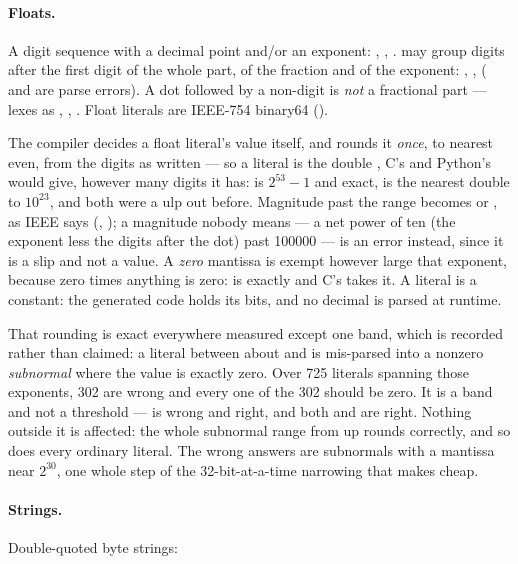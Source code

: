 \paragraph{Floats.} A digit sequence with a decimal point and/or an
exponent: , , . \ic{\_} may group digits
after the first digit of the whole part, of the fraction and of the
exponent: , ,  ( and
 are parse errors). A dot followed by a non-digit is
\emph{not} a fractional part ---  lexes as , ,
. Float literals are IEEE-754 binary64 ().

The compiler decides a float literal's value itself, and rounds it
\emph{once}, to nearest even, from the digits as written --- so a
literal is the double , C's  and Python's 
would give, however many digits it has:  is
$2^{53}-1$ and exact,  is the nearest double to $10^{23}$, and
both were a ulp out before. Magnitude past the range becomes  or
, as IEEE says (, ); a magnitude nobody
means --- a net power of ten (the exponent less the digits after the dot)
past 100000 --- is an error instead, since it is a slip and not a value.
A \emph{zero} mantissa is exempt however large that exponent, because
zero times anything is zero:  is exactly  and C's
 takes it. A literal is a constant: the generated code holds
its bits, and no decimal is parsed at runtime.

That rounding is exact everywhere measured except one band, which is
recorded rather than claimed: a literal between about  and
 is mis-parsed into a nonzero \emph{subnormal} where the
value is exactly zero. Over 725 literals spanning those exponents, 302
are wrong and every one of the 302 should be zero. It is a band and not
a threshold ---  is wrong and  right, and both
 and  are right. Nothing outside it is affected: the
whole subnormal range from  up rounds correctly, and so does
every ordinary literal. The wrong answers are subnormals with a mantissa
near $2^{30}$, one whole step of the 32-bit-at-a-time narrowing that
makes  cheap.

\paragraph{Strings.} Double-quoted byte strings:

